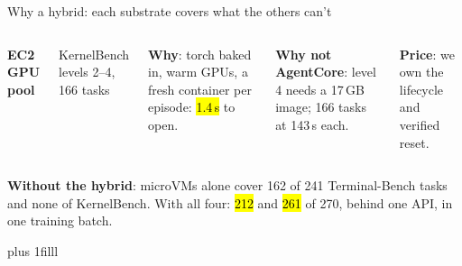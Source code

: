\begin{frame}{Why a hybrid: each substrate covers what the others can't}
\begin{columns}[T]
{{{\footnotesize\bfseries\textcolor{cat1}{EC2 GPU pool}}\par
{\tiny\textcolor{inkmuted}{KernelBench levels 2--4, 166 tasks}}\par\vspace{1mm}
\textbf{Why}: torch baked in, warm GPUs, a fresh container per episode: \hl{1.4\,s} to open.\par\vspace{1mm}
\textbf{Why not AgentCore}: level 4 needs a 17\,GB image; 166 tasks at 143\,s each.\par\vspace{1mm}
\textbf{Price}: we own the lifecycle and verified reset.}}
\end{columns}
\par\vspace{2mm}
{\small\textbf{Without the hybrid}: microVMs alone cover 162 of 241 Terminal-Bench tasks and none of KernelBench. With all four: \hl{212} and \hl{261} of 270, behind one API, in one training batch.\par}
\par\vskip 0pt plus 1filll
\end{frame}

